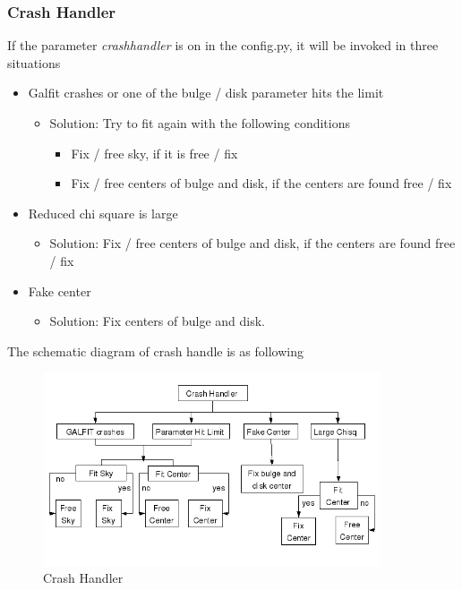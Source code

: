 \documentclass[a4paper,12pt]{article}
\begin{document}
\subsubsection*{Crash Handler}
If the parameter \textit{crashhandler} is on in the config.py, it will be invoked in three situations
\begin{itemize}
\item Galfit crashes or one of the bulge / disk parameter hits the limit
\begin{itemize}
\item[] Solution: Try to fit again with the following conditions
\begin{itemize}
\item Fix / free sky, if it is free / fix
\item Fix / free centers of bulge and disk, if the centers are found free / fix
\end{itemize}
\end{itemize}

\item Reduced chi square is large
\begin{itemize}
\item[] Solution: Fix / free centers of bulge and disk, if the centers are found free / fix
\end{itemize}

\item Fake center
\begin{itemize}
\item[] Solution: Fix centers of bulge and disk.
\end{itemize}
\end{itemize}
The schematic diagram of crash handle is as following
\begin{figure}
 \centering
 \includegraphics[width=10cm, height=5.7cm, bb=0 0 635 363]{pipeline-arch5.png}
 \caption{Crash Handler}
 \label{fig:arch5}
\end{figure}
\end{document}
